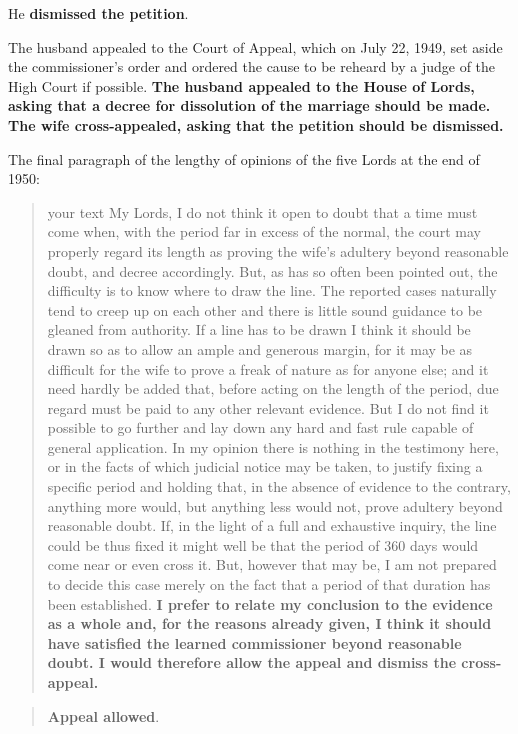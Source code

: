 \documentclass[]{book}
\begin{document}
He \textbf{dismissed the petition}.

The husband appealed to the Court of Appeal, which on July 22, 1949, set aside the commissioner's order and ordered the cause to be reheard by a judge of the High Court if possible. \textbf{The husband appealed to the House of Lords, asking that a decree for dissolution of the marriage should be made. The wife cross-appealed, asking that the petition should be dismissed.}

The final paragraph of the lengthy of opinions of the five Lords at the end of 1950:

\begin{quote}
your text My Lords, I do not think it open to doubt that a time must come when, with the period far in excess of the normal, the court may properly regard its length as proving the wife's adultery beyond reasonable doubt, and decree accordingly. But, as has so often been pointed out, the difficulty is to know where to draw the line. The reported cases naturally tend to creep up on each other and there is little sound guidance to be gleaned from authority. If a line has to be drawn I think it should be drawn so as to allow an ample and generous margin, for it may be as difficult for the wife to prove a freak of nature as for anyone else; and it need hardly be added that, before acting on the length of the period, due regard must be paid to any other relevant evidence. But I do not find it possible to go further and lay down any hard and fast rule capable of general application. In my opinion there is nothing in the testimony here, or in the facts of which judicial notice may be taken, to justify fixing a specific period and holding that, in the absence of evidence to the contrary, anything more would, but anything less would not, prove adultery beyond reasonable doubt. If, in the light of a full and exhaustive inquiry, the line could be thus fixed it might well be that the period of 360 days would come near or even cross it. But, however that may be, I am not prepared to decide this case merely on the fact that a period of that duration has been established. \textbf{I prefer to relate my conclusion to the evidence as a whole and, for the reasons already given, I think it should have satisfied the learned commissioner beyond reasonable doubt.
I would therefore allow the appeal and
dismiss the cross- appeal.}
\end{quote}

\begin{quote}
\textbf{Appeal allowed}.
\end{quote}
\end{document}
